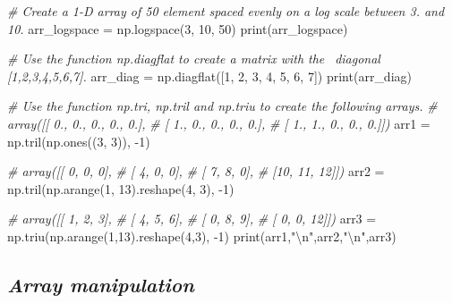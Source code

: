 \documentclass[11pt]{article}
\newenvironment{Shaded}{}{}
\newcommand{\DecValTok}[1]{\textcolor[rgb]{0.25,0.63,0.44}{{#1}}}
\newcommand{\CharTok}[1]{\textcolor[rgb]{0.25,0.44,0.63}{{#1}}}
\newcommand{\StringTok}[1]{\textcolor[rgb]{0.25,0.44,0.63}{{#1}}}
\newcommand{\CommentTok}[1]{\textcolor[rgb]{0.38,0.63,0.69}{\textit{{#1}}}}
\newcommand{\NormalTok}[1]{{#1}}
\newcommand{\OperatorTok}[1]{\textcolor[rgb]{0.40,0.40,0.40}{{#1}}}
\newcommand{\BuiltInTok}[1]{{#1}}
\begin{document}
\begin{Shaded}
\begin{tcolorbox}[breakable, size=fbox, boxrule=1pt, pad at break*=1mm,colback=cellbackground, colframe=cellborder]
\begin{Highlighting}[]
\CommentTok{\# Create a 1{-}D array of 50 element spaced evenly on a log scale between 3. and 10.}
\NormalTok{arr\_logspace }\OperatorTok{=}\NormalTok{ np.logspace(}\DecValTok{3}\NormalTok{, }\DecValTok{10}\NormalTok{, }\DecValTok{50}\NormalTok{)}
\BuiltInTok{print}\NormalTok{(arr\_logspace)}

\CommentTok{\# Use the function np.diagflat to create a matrix with the }
\CommentTok{\ diagonal [1,2,3,4,5,6,7].}
\NormalTok{arr\_diag }\OperatorTok{=}\NormalTok{ np.diagflat([}\DecValTok{1}\NormalTok{, }\DecValTok{2}\NormalTok{, }\DecValTok{3}\NormalTok{, }\DecValTok{4}\NormalTok{, }\DecValTok{5}\NormalTok{, }\DecValTok{6}\NormalTok{, }\DecValTok{7}\NormalTok{])}
\BuiltInTok{print}\NormalTok{(arr\_diag)}

\CommentTok{\# Use the function np.tri, np.tril and np.triu to create the following arrays.}
\CommentTok{\# array([[ 0., 0., 0., 0., 0.],}
\CommentTok{\#        [ 1., 0., 0., 0., 0.],}
\CommentTok{\#        [ 1., 1., 0., 0., 0.]])}
\NormalTok{arr1 }\OperatorTok{=}\NormalTok{ np.tril(np.ones((}\DecValTok{3}\NormalTok{, }\DecValTok{3}\NormalTok{)), }\OperatorTok{{-}}\DecValTok{1}\NormalTok{)}

\CommentTok{\# array([[ 0,  0,  0],}
\CommentTok{\#        [ 4,  0,  0],}
\CommentTok{\#        [ 7,  8,  0],}
\CommentTok{\#        [10, 11, 12]])}
\NormalTok{arr2 }\OperatorTok{=}\NormalTok{ np.tril(np.arange(}\DecValTok{1}\NormalTok{, }\DecValTok{13}\NormalTok{).reshape(}\DecValTok{4}\NormalTok{, }\DecValTok{3}\NormalTok{), }\OperatorTok{{-}}\DecValTok{1}\NormalTok{)}

\CommentTok{\# array([[ 1, 2, 3],}
\CommentTok{\#        [ 4, 5, 6],}
\CommentTok{\#        [ 0, 8, 9],}
\CommentTok{\#        [ 0, 0, 12]])}
\NormalTok{arr3 }\OperatorTok{=}\NormalTok{ np.triu(np.arange(}\DecValTok{1}\NormalTok{,}\DecValTok{13}\NormalTok{).reshape(}\DecValTok{4}\NormalTok{,}\DecValTok{3}\NormalTok{), }\OperatorTok{{-}}\DecValTok{1}\NormalTok{)}
\BuiltInTok{print}\NormalTok{(arr1,}\StringTok{"}\CharTok{\textbackslash{}n}\StringTok{"}\NormalTok{,arr2,}\StringTok{"}\CharTok{\textbackslash{}n}\StringTok{"}\NormalTok{,arr3)}
\end{Highlighting}
\end{tcolorbox}
\end{Shaded}



  \hypertarget{array-manipulation}{%
  \subsection{\texorpdfstring{\emph{Array
  manipulation}}{Array manipulation}}\label{array-manipulation}}
\end{document}
